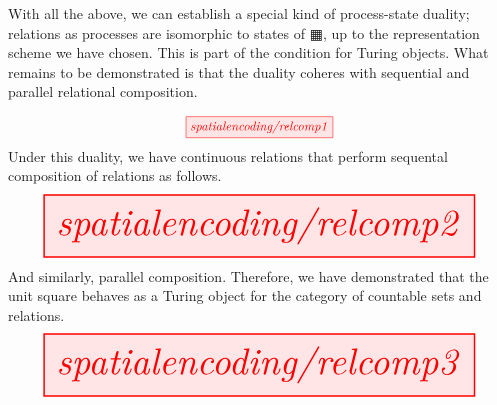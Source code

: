 \begin{construction}\label{cons:unitencoding}
With all the above, we can establish a special kind of process-state duality; relations as processes are isomorphic to states of $\squarehvfill$, up to the representation scheme we have chosen. This is part of the condition for Turing objects. What remains to be demonstrated is that the duality coheres with sequential and parallel relational composition.
\end{construction}
\[\scalebox{0.9}{\tikzfig{spatialencoding/relcomp1}}\]
Under this duality, we have continuous relations that perform sequental composition of relations as follows.
\[\resizebox{\textwidth}{!}{\tikzfig{spatialencoding/relcomp2}}\]
And similarly, parallel composition. Therefore, we have demonstrated that the unit square behaves as a Turing object for the category of countable sets and relations.
\[\resizebox{\textwidth}{!}{\tikzfig{spatialencoding/relcomp3}}\]